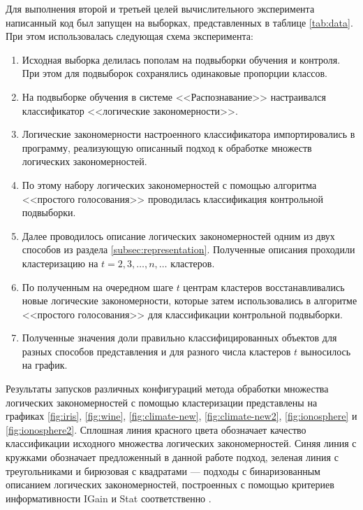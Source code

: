 \documentclass[12pt]{article}
\begin{document}
Для выполнения второй и третьей целей вычислительного эксперимента
написанный код был запущен на выборках, представленных в таблице
\ref{tab:data}. При этом использовалась следующая схема эксперимента:

\begin{enumerate}
  \item Исходная выборка делилась пополам на подвыборки обучения и
    контроля. При этом для подвыборок сохранялись одинаковые пропорции
    классов.
  \item На подвыборке обучения в системе <<Распознавание>>
    настраивался классификатор <<логические закономерности>>.
  \item Логические закономерности настроенного классификатора
    импортировались в программу, реализующую описанный подход к
    обработке множеств логических закономерностей.
  \item По этому набору логических закономерностей с помощью
    алгоритма <<простого голосования>> \cite{voron10logicalgs}
    проводилась классификация контрольной подвыборки.
  \item Далее проводилось описание логических закономерностей одним из
    двух способов из раздела \ref{subsec:representation}. Полученные
    описания проходили кластеризацию на \(t = 2, 3, \dots, n, \dots\)
    кластеров.
  \item По полученным на очередном шаге \(t\) центрам кластеров
    восстанавливались новые логические закономерности, которые затем
    использовались в алгоритме <<простого голосования>> для
    классификации контрольной подвыборки.
  \item Полученные значения доли правильно классифицированных объектов
    для разных способов представления и для разного числа кластеров
    \(t\) выносилось на график.
\end{enumerate}

Результаты запусков различных конфигураций метода обработки множества
логических закономерностей с помощью кластеризации представлены на
графиках \ref{fig:iris}, \ref{fig:wine}, \ref{fig:climate-new},
\ref{fig:climate-new2}, \ref{fig:ionosphere} и \ref{fig:ionosphere2}.
Сплошная линия красного цвета обозначает качество классификации
исходного множества логических закономерностей. Синяя линия с кружками
обозначает предложенный в данной работе подход, зеленая линия с
треугольниками и бирюзовая с квадратами --- подходы с бинаризованным
описанием логических закономерностей, построенных с помощью критериев
информативности IGain и Stat соответственно \cite{voron10logicalgs}.
\end{document}
